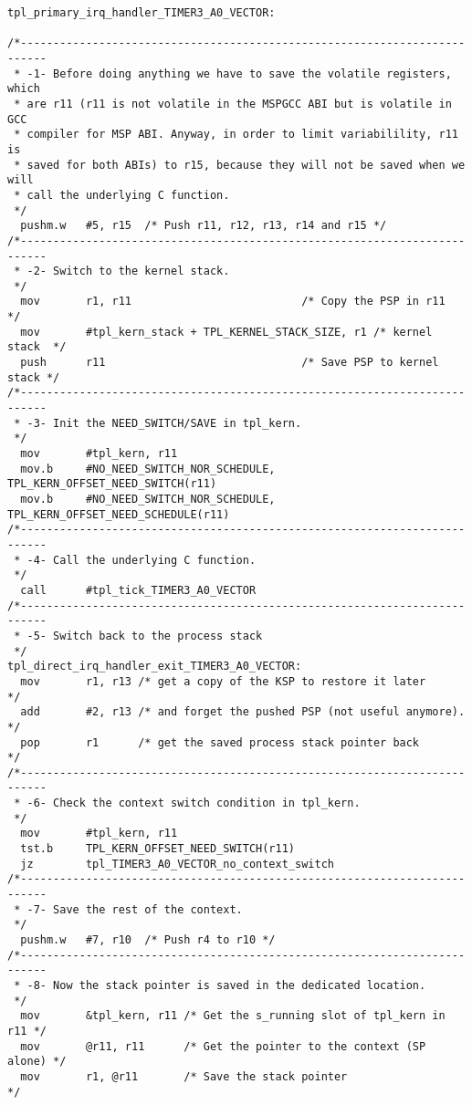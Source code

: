 \documentclass[11pt, oneside]{article}   	%
\begin{document}
\begin{lstlisting}[basicstyle=\footnotesize\ttfamily]
tpl_primary_irq_handler_TIMER3_A0_VECTOR:

/*--------------------------------------------------------------------------
 * -1- Before doing anything we have to save the volatile registers, which
 * are r11 (r11 is not volatile in the MSPGCC ABI but is volatile in GCC
 * compiler for MSP ABI. Anyway, in order to limit variabilility, r11 is 
 * saved for both ABIs) to r15, because they will not be saved when we will
 * call the underlying C function.
 */
  pushm.w   #5, r15  /* Push r11, r12, r13, r14 and r15 */
/*--------------------------------------------------------------------------
 * -2- Switch to the kernel stack.
 */
  mov       r1, r11                          /* Copy the PSP in r11      */
  mov       #tpl_kern_stack + TPL_KERNEL_STACK_SIZE, r1 /* kernel stack  */
  push      r11                              /* Save PSP to kernel stack */
/*--------------------------------------------------------------------------
 * -3- Init the NEED_SWITCH/SAVE in tpl_kern.
 */
  mov       #tpl_kern, r11
  mov.b     #NO_NEED_SWITCH_NOR_SCHEDULE, TPL_KERN_OFFSET_NEED_SWITCH(r11)
  mov.b     #NO_NEED_SWITCH_NOR_SCHEDULE, TPL_KERN_OFFSET_NEED_SCHEDULE(r11)
/*--------------------------------------------------------------------------
 * -4- Call the underlying C function.
 */
  call      #tpl_tick_TIMER3_A0_VECTOR
/*--------------------------------------------------------------------------
 * -5- Switch back to the process stack
 */
tpl_direct_irq_handler_exit_TIMER3_A0_VECTOR:
  mov       r1, r13 /* get a copy of the KSP to restore it later        */
  add       #2, r13 /* and forget the pushed PSP (not useful anymore).  */
  pop       r1      /* get the saved process stack pointer back         */
/*--------------------------------------------------------------------------
 * -6- Check the context switch condition in tpl_kern.
 */
  mov       #tpl_kern, r11
  tst.b     TPL_KERN_OFFSET_NEED_SWITCH(r11)
  jz        tpl_TIMER3_A0_VECTOR_no_context_switch
/*--------------------------------------------------------------------------
 * -7- Save the rest of the context.
 */ 
  pushm.w   #7, r10  /* Push r4 to r10 */
/*--------------------------------------------------------------------------
 * -8- Now the stack pointer is saved in the dedicated location.
 */  
  mov       &tpl_kern, r11 /* Get the s_running slot of tpl_kern in r11 */
  mov       @r11, r11      /* Get the pointer to the context (SP alone) */
  mov       r1, @r11       /* Save the stack pointer                    */

\end{lstlisting}
\end{document}
